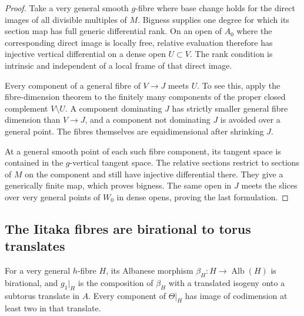 \begin{proof}
Take a very general smooth $g$-fibre where base change holds for the
direct images of all divisible multiples of $M$.  Bigness supplies
one degree for which its section map has full generic differential
rank.  On an open of $A_0$ where the corresponding direct image is
locally free, relative evaluation therefore has injective vertical
differential on a dense open $U\subset V$.  The rank condition is
intrinsic and independent of a local frame of that direct image.

Every component of a general fibre of $V\to J$ meets $U$.  To see
this, apply the fibre-dimension theorem to the finitely many
components of the proper closed complement $V\setminus U$.  A
component dominating $J$ has strictly smaller general fibre dimension
than $V\to J$, and a component not dominating $J$ is avoided over
a general point.  The fibres themselves are equidimensional after
shrinking $J$.

At a general smooth point of each such fibre component, its tangent
space is contained in the $g$-vertical tangent space.  The relative
sections restrict to sections of $M$ on the component and still have
injective differential there.  They give a generically finite map,
which proves bigness.  The same open in $J$ meets the slices over
very general points of $W_0$ in dense opens, proving the last
formulation.
\end{proof}

\subsection{The Iitaka fibres are birational to torus translates}

\begin{lemma}\label{in:torus-fibres}
For a very general $h$-fibre $H$, its Albanese morphism
$\beta_H:H\to\operatorname{Alb}(H)$ is birational, and
$g_1|_H$ is the composition of $\beta_H$ with a translated isogeny
onto a subtorus translate in $A$.  Every component of $\Theta|_H$
has image of codimension at least two in that translate.
\end{lemma}

